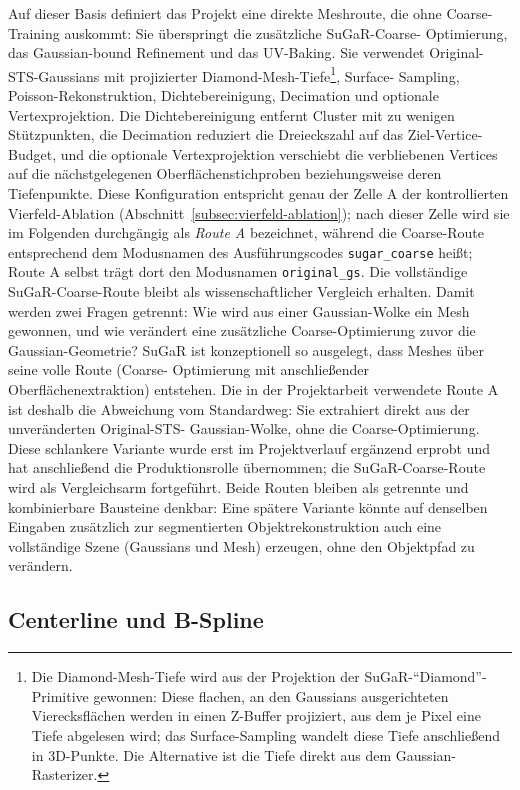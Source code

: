 Auf dieser Basis definiert das Projekt eine direkte Meshroute, die ohne
Coarse-Training auskommt: Sie überspringt die zusätzliche SuGaR-Coarse-
Optimierung, das Gaussian-bound Refinement und das UV-Baking. Sie verwendet
Original-STS-Gaussians mit projizierter Diamond-Mesh-Tiefe\footnote{Die
Diamond-Mesh-Tiefe wird aus der Projektion der SuGaR-``Diamond''-Primitive
gewonnen: Diese flachen, an den Gaussians ausgerichteten Vierecksflächen
werden in einen Z-Buffer projiziert, aus dem je Pixel eine Tiefe abgelesen
wird; das Surface-Sampling wandelt diese Tiefe anschließend in 3D-Punkte. Die
Alternative ist die Tiefe direkt aus dem Gaussian-Rasterizer.}, Surface-
Sampling, Poisson-Rekonstruktion, Dichtebereinigung, Decimation und optionale
Vertexprojektion. Die Dichtebereinigung entfernt Cluster mit zu wenigen
Stützpunkten, die Decimation reduziert die Dreieckszahl auf das Ziel-Vertice-
Budget, und die optionale Vertexprojektion verschiebt die verbliebenen
Vertices auf die nächstgelegenen Oberflächenstichproben beziehungsweise deren
Tiefenpunkte. Diese Konfiguration entspricht genau der Zelle A der
kontrollierten Vierfeld-Ablation (Abschnitt~\ref{subsec:vierfeld-ablation});
nach dieser Zelle wird sie im Folgenden durchgängig als \emph{Route A}
bezeichnet, während die Coarse-Route entsprechend dem Modusnamen des
Ausführungscodes \texttt{sugar\_coarse} heißt; Route A selbst trägt dort den
Modusnamen \texttt{original\_gs}. Die vollständige SuGaR-Coarse-Route bleibt als
wissenschaftlicher Vergleich erhalten. Damit werden zwei Fragen getrennt:
Wie wird aus einer Gaussian-Wolke ein Mesh gewonnen, und wie verändert eine
zusätzliche Coarse-Optimierung zuvor die Gaussian-Geometrie? SuGaR ist
konzeptionell so ausgelegt, dass Meshes über seine volle Route (Coarse-
Optimierung mit anschließender Oberflächenextraktion) entstehen. Die in der
Projektarbeit verwendete Route A ist deshalb die Abweichung vom
Standardweg: Sie extrahiert direkt aus der unveränderten Original-STS-
Gaussian-Wolke, ohne die Coarse-Optimierung. Diese schlankere Variante wurde
erst im Projektverlauf ergänzend erprobt und hat anschließend die
Produktionsrolle übernommen; die SuGaR-Coarse-Route wird als
Vergleichsarm fortgeführt. Beide Routen bleiben als getrennte und
kombinierbare Bausteine denkbar: Eine spätere Variante könnte auf denselben
Eingaben zusätzlich zur segmentierten Objektrekonstruktion auch eine
vollständige Szene (Gaussians und Mesh) erzeugen, ohne den Objektpfad zu
verändern.

\subsection{Centerline und B-Spline}

